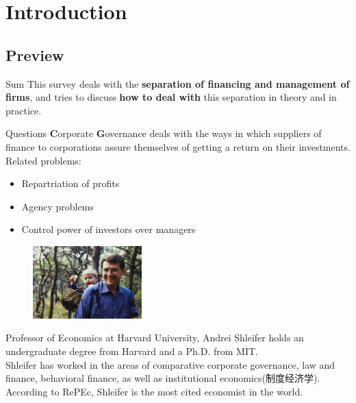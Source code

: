 
\section{Introduction}

\subsection{Preview}
	\begin{frame}{Sum}
	This survey deals with the \textbf{separation of financing and management of firms}, and tries to discuss \textbf{how to deal with} this separation in theory and in practice. 
\end{frame}

	\begin{frame}{Questions}
	\textbf{C}orporate \textbf{G}overnance deals with the ways in which suppliers of finance to corporations assure themselves of getting a return on their investments.\\Related problems:
	\begin{itemize}
		\item Repartriation of profits
		\item Agency problems
		\item Control power of investors over managers
	\end{itemize}

\end{frame}
	\begin{frame}{
		}
	\begin{figure}%
		\includegraphics[height=2.8cm]{grap/shleifer.jpg}
	\end{figure}
	Professor of Economics at Harvard University, Andrei Shleifer holds an undergraduate degree from Harvard and a Ph.D. from MIT.\\
	\vspace{1em}
	Shleifer has worked in the areas of comparative corporate governance, law and finance, behavioral finance, as well as institutional economics(制度经济学). According to RePEc, Shleifer is the most cited economist in the world.
\end{frame}

